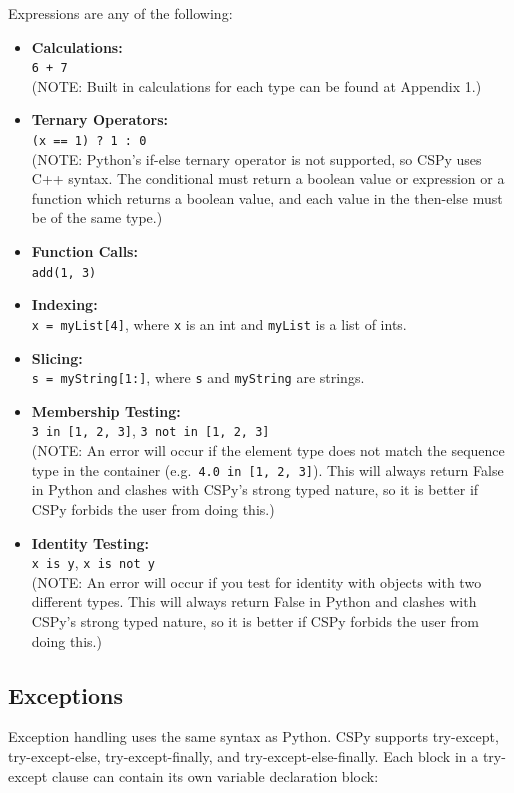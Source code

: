 \documentclass{article}
\begin{document}
Expressions are any of the following:
\begin{itemize}
\item\textbf{Calculations:} \\
\verb|6 + 7| \\
(NOTE: Built in calculations for each type can be found at Appendix 1.)

\item\textbf{Ternary Operators:} \\
\verb|(x == 1) ? 1 : 0| \\
(NOTE: Python's if-else ternary operator is not supported, so CSPy uses C++ syntax. The conditional must return a boolean value or expression or a function which returns a boolean value, and each value in the then-else must be of the same type.) 

\item\textbf{Function Calls:} \\
\verb|add(1, 3)| 

\item\textbf{Indexing:} \\
\verb|x = myList[4]|, where \verb|x| is an int and \verb|myList| is a list of ints. 

\item\textbf{Slicing:} \\
\verb|s = myString[1:]|, where \verb|s| and \verb|myString| are strings. 

\item\textbf{Membership Testing:} \\
\verb|3 in [1, 2, 3]|, \verb|3 not in [1, 2, 3]| \\
(NOTE: An error will occur if the element type does not match the sequence type in the container (e.g.\verb| 4.0 in [1, 2, 3]|). This will always return False in Python and clashes with CSPy's strong typed nature, so it is better if CSPy forbids the user from doing this.) 

\item\textbf{Identity Testing:} \\
\verb|x is y|, \verb|x is not y| \\
(NOTE: An error will occur if you test for identity with objects with two different types. This will always return False in Python and clashes with CSPy's strong typed nature, so it is better if CSPy forbids the user from doing this.)
\end{itemize}

\subsection{Exceptions} \label{exceptions}
Exception handling uses the same syntax as Python. CSPy supports try-except, try-except-else, try-except-finally, and try-except-else-finally. Each block in a try-except clause can contain its own variable declaration block:
\end{document}
